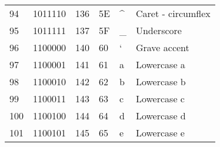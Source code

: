 \begin{center}
\begin{longtable}{llllll}
\rowcolor[HTML]{F3F6F6} 
{\color[HTML]{404040} 94}               & {\color[HTML]{404040} 1011110}         & {\color[HTML]{404040} 136}            & {\color[HTML]{404040} 5E}                   & {\color[HTML]{404040} \textasciicircum{}} & {\color[HTML]{404040} Caret - circumflex}                    \\
\rowcolor[HTML]{FCFCFC} 
{\color[HTML]{404040} 95}               & {\color[HTML]{404040} 1011111}         & {\color[HTML]{404040} 137}            & {\color[HTML]{404040} 5F}                   & {\color[HTML]{404040} \_}                 & {\color[HTML]{404040} Underscore}                            \\
\rowcolor[HTML]{F3F6F6} 
{\color[HTML]{404040} 96}               & {\color[HTML]{404040} 1100000}         & {\color[HTML]{404040} 140}            & {\color[HTML]{404040} 60}                   & {\color[HTML]{9B59B6} `}                  & {\color[HTML]{404040} Grave accent}                          \\
\rowcolor[HTML]{FCFCFC} 
{\color[HTML]{404040} 97}               & {\color[HTML]{404040} 1100001}         & {\color[HTML]{404040} 141}            & {\color[HTML]{404040} 61}                   & {\color[HTML]{404040} a}                  & {\color[HTML]{404040} Lowercase a}                           \\
\rowcolor[HTML]{F3F6F6} 
{\color[HTML]{404040} 98}               & {\color[HTML]{404040} 1100010}         & {\color[HTML]{404040} 142}            & {\color[HTML]{404040} 62}                   & {\color[HTML]{404040} b}                  & {\color[HTML]{404040} Lowercase b}                           \\
\rowcolor[HTML]{FCFCFC} 
{\color[HTML]{404040} 99}               & {\color[HTML]{404040} 1100011}         & {\color[HTML]{404040} 143}            & {\color[HTML]{404040} 63}                   & {\color[HTML]{404040} c}                  & {\color[HTML]{404040} Lowercase c}                           \\
\rowcolor[HTML]{F3F6F6} 
{\color[HTML]{404040} 100}              & {\color[HTML]{404040} 1100100}         & {\color[HTML]{404040} 144}            & {\color[HTML]{404040} 64}                   & {\color[HTML]{404040} d}                  & {\color[HTML]{404040} Lowercase d}                           \\
\rowcolor[HTML]{FCFCFC} 
{\color[HTML]{404040} 101}              & {\color[HTML]{404040} 1100101}         & {\color[HTML]{404040} 145}            & {\color[HTML]{404040} 65}                   & {\color[HTML]{404040} e}                  & {\color[HTML]{404040} Lowercase e}                           \\

\end{longtable}
\end{center}
